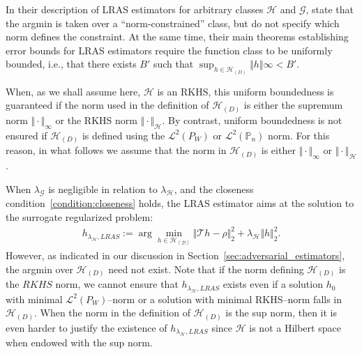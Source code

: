 \documentclass[twoside,11pt]{article}
\newcommand{\mc}{\mathcal}
\begin{document}
In their description of LRAS estimators for arbitrary classes $\mc{H}$ and $\mc{G}$, \cite{bennett2023source} state that the argmin is taken over a “norm-constrained” class, but do not specify which norm defines the constraint. At the same time, their main theorems establishing error bounds for LRAS estimators require the function class to be uniformly bounded, i.e., that there exists $B'$ such that $\sup_{h \in \mc{H}_{(D)}} \Vert h \Vert\infty < B'$.

When, as we shall assume here, $\mc{H}$ is an RKHS, this uniform boundedness is guaranteed if the norm used in the definition of $\mc{H}_{(D)}$ is either the supremum norm $\Vert \cdot \Vert_\infty$ or the RKHS norm $\Vert \cdot \Vert_\mc{H}$. By contrast, uniform boundedness is not ensured if $\mc{H}_{(D)}$ is defined using the $\mc{L}^2(P_W)$ or $\mc{L}^2(\mathbb{P}_n)$ norm. For this reason, in what follows we assume that the norm in $\mc{H}_{(D)}$ is either $\Vert \cdot \Vert_\infty$ or $\Vert \cdot \Vert_\mc{H}$.

When $\lambda_{\mc{G}}$ is negligible in relation to $\lambda_{\mc{H}}$, and the closeness condition~\eqref{condition:closeness} holds, the LRAS estimator aims at the solution to the surrogate regularized problem:
\begin{align*}
h_{\lambda_{\mc{H}},LRAS}:=\arg\min_{h\in\mc{H_{(D)}}}\Vert \mc{T}h - \rho \Vert_2^2 +\lambda_{\mc{H}}\Vert h \Vert_2^2.
\end{align*}
However, as indicated in our discussion in Section~\ref{sec:adversarial_estimators}, the argmin over $\mc{H}_{(D)}$ need not exist. Note that if the norm defining $\mc{H}_{(D)}$ is the $RKHS$ norm, we cannot ensure that $h_{\lambda_{\mc{H}},LRAS}$ exists even if a solution $h_0$ with minimal $\mc{L}^2(P_W)$--norm or a solution with minimal RKHS--norm falls in $\mc{H}_{(D)}$. When the norm in the definition of $\mc{H}_{(D)}$ is the sup norm, then it is even harder to justify the existence of $h_{\lambda_{\mc{H}},LRAS}$ since $\mc{H}$ is not a Hilbert space when endowed with the sup norm.
\end{document}
